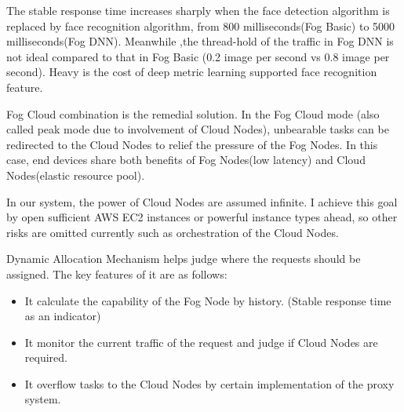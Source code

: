 The stable response time increases sharply when the face detection algorithm is replaced by face recognition algorithm, from 800 milliseconds(Fog Basic) to 5000 milliseconds(Fog DNN). Meanwhile ,the thread-hold of the traffic in Fog DNN is not ideal compared to that in Fog Basic (0.2 image per second vs 0.8 image per second). Heavy is the cost of deep metric learning supported face recognition feature.

Fog Cloud combination is the remedial solution. In the Fog Cloud mode (also called peak mode due to involvement of Cloud Nodes), unbearable tasks can be redirected to the Cloud Nodes to relief the pressure of the Fog Nodes. In this case, end devices share both benefits of Fog Nodes(low latency) and Cloud Nodes(elastic resource pool). 

In our system, the power of Cloud Nodes are assumed infinite. I achieve this goal by open sufficient AWS EC2 instances or powerful instance types ahead, so other risks are omitted currently such as orchestration of the Cloud Nodes.

Dynamic Allocation Mechanism helps judge where the requests should be assigned. The key features of it are as follows:
\begin{itemize}
    \item It calculate the capability of the Fog Node by history. (Stable response time as an indicator)
    \item It monitor the current traffic of the request and judge if Cloud Nodes are required.
    \item It overflow tasks to the Cloud Nodes by certain implementation of the proxy system.
\end{itemize}